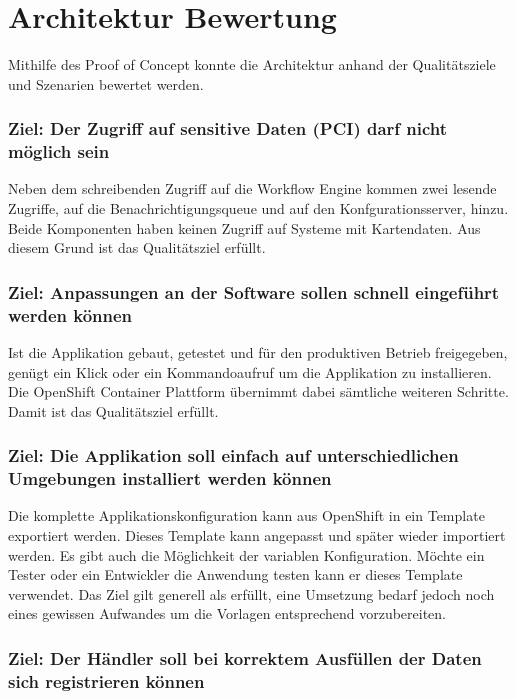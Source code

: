\section{Architektur Bewertung}

Mithilfe des Proof of Concept konnte die Architektur anhand der Qualitätsziele und Szenarien bewertet werden.

\subsubsection{Ziel: Der Zugriff auf sensitive Daten (PCI) darf nicht möglich sein}

Neben dem schreibenden Zugriff auf die Workflow Engine kommen zwei lesende Zugriffe, auf die Benachrichtigungsqueue und auf den Konfgurationsserver, hinzu. Beide Komponenten haben keinen Zugriff auf Systeme mit Kartendaten. Aus diesem Grund ist das Qualitätsziel erfüllt.

\subsubsection{Ziel: Anpassungen an der Software sollen schnell eingeführt werden können}

Ist die Applikation gebaut, getestet und für den produktiven Betrieb freigegeben, genügt ein Klick oder ein Kommandoaufruf um die Applikation zu installieren. Die OpenShift Container Plattform übernimmt dabei sämtliche weiteren Schritte. Damit ist das Qualitätsziel erfüllt.

\subsubsection{Ziel: Die Applikation soll einfach auf unterschiedlichen Umgebungen installiert werden können}

Die komplette Applikationskonfiguration kann aus OpenShift in ein Template exportiert werden. Dieses Template kann angepasst und später wieder importiert werden. Es gibt auch die Möglichkeit der variablen Konfiguration. Möchte ein Tester oder ein Entwickler die Anwendung testen kann er dieses Template verwendet. Das Ziel gilt generell als erfüllt, eine Umsetzung bedarf jedoch noch eines gewissen Aufwandes um die Vorlagen entsprechend vorzubereiten.

\subsubsection{Ziel: Der Händler soll bei korrektem Ausfüllen der Daten sich registrieren können}

